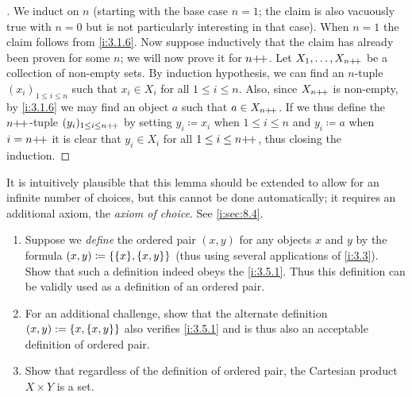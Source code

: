 \begin{proof}[]
  We induct on \(n\) (starting with the base case \(n = 1\); the claim is also vacuously true with \(n = 0\) but is not particularly interesting in that case).
  When \(n = 1\) the claim follows from \cref{i:3.1.6}.
  Now suppose inductively that the claim has already been proven for some \(n\);
  we will now prove it for \(n{+}\!{+}\).
  Let \(X_1, \dots, X_{n{+}\!{+}}\) be a collection of non-empty sets.
  By induction hypothesis, we can find an \(n\)-tuple \((x_i)_{1 \leq i \leq n}\) such that \(x_i \in X_i\) for all \(1 \leq i \leq n\).
  Also, since \(X_{n{+}\!{+}}\) is non-empty, by \cref{i:3.1.6} we may find an object \(a\) such that \(a \in X_{n{+}\!{+}}\).
  If we thus define the \(n{+}\!{+}\)-tuple \((y_i)_{1 \leq i \leq n{+}\!{+}}\) by setting \(y_i \coloneqq x_i\) when \(1 \leq i \leq n\) and \(y_i \coloneqq a\) when \(i = n{+}\!{+}\) it is clear that \(y_i \in X_i\) for all \(1 \leq i \leq n{+}\!{+}\), thus closing the induction.
\end{proof}

\begin{rmk}\label{i:3.5.13}
  It is intuitively plausible that this lemma should be extended to allow for an infinite number of choices, but this cannot be done automatically;
  it requires an additional axiom, the \emph{axiom of choice}.
  See \cref{i:sec:8.4}.
\end{rmk}

\exercisesection

\begin{ex}\label{i:ex:3.5.1}
  \begin{enumerate}
    \item Suppose we \emph{define} the ordered pair \((x, y)\) for any objects \(x\) and \(y\) by the formula \((x, y) \coloneqq \set{\set{x}, \set{x, y}}\)
          (thus using several applications of \cref{i:3.3}).
          Show that such a definition indeed obeys the \cref{i:3.5.1}.
          Thus this definition can be validly used as a definition of an ordered pair.
    \item For an additional challenge, show that the alternate definition \((x, y) := \left\lbrace x, \left\lbrace x, y\right\rbrace\right\rbrace\) also verifies \cref{i:3.5.1} and is thus also an acceptable definition of ordered pair.
    \item Show that regardless of the definition of ordered pair, the Cartesian product \(X \times Y\) is a set.
  \end{enumerate}
\end{ex}

